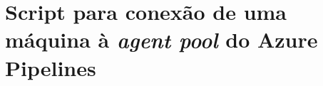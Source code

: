 \chapter{Script para conexão de uma máquina à \textit{agent pool} do Azure Pipelines}
\label{app:pipeline-start.sh}


